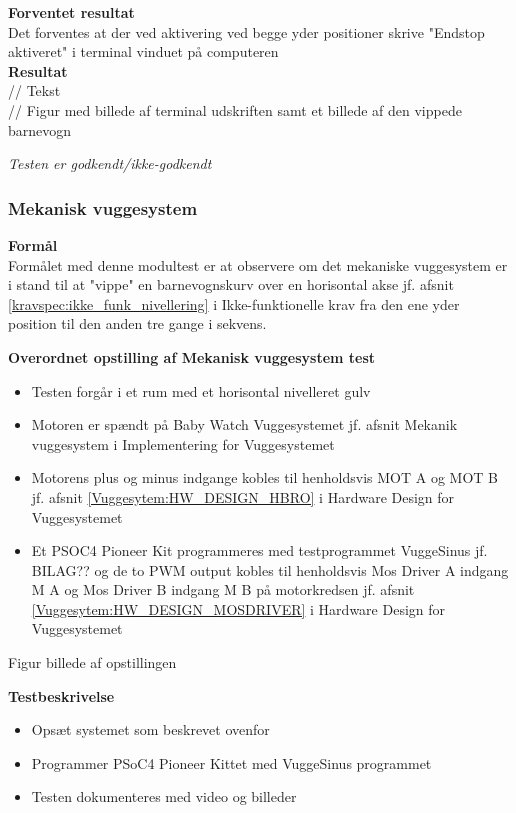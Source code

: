 \textbf{Forventet resultat} \\
Det forventes at der ved aktivering ved begge yder positioner skrive "Endstop aktiveret" i terminal vinduet på computeren \\
\textbf{Resultat} \\
// Tekst \\

// Figur med billede af terminal udskriften samt et billede af den vippede barnevogn

\textit{Testen er godkendt/ikke-godkendt}



\subsubsection{Mekanisk vuggesystem}
\textbf{Formål} \\
Formålet med denne modultest er at observere om det mekaniske vuggesystem er i stand til at "vippe" en barnevognskurv over en horisontal akse jf. afsnit \vref{kravspec:ikke_funk_nivellering} i Ikke-funktionelle krav fra den ene yder position til den anden tre gange i sekvens. 

\textbf{Overordnet opstilling af Mekanisk vuggesystem test}

\begin{itemize}
	\item Testen forgår i et rum med et horisontal nivelleret gulv
	\item Motoren er spændt på Baby Watch Vuggesystemet jf. afsnit Mekanik vuggesystem i Implementering for Vuggesystemet
	\item Motorens plus og minus indgange kobles til henholdsvis MOT A og MOT B jf. afsnit \ref{Vuggesytem:HW_DESIGN_HBRO} i Hardware Design for Vuggesystemet
	\item Et PSOC4 Pioneer Kit \citep{website:Cypress} programmeres med testprogrammet VuggeSinus jf. BILAG?? og de to PWM output kobles til henholdsvis Mos Driver A indgang M A og Mos Driver B indgang M B på motorkredsen jf. afsnit \vref{Vuggesytem:HW_DESIGN_MOSDRIVER} i Hardware Design for Vuggesystemet
\end{itemize}

Figur billede af opstillingen

\textbf{Testbeskrivelse}
\begin{itemize}
	\item Opsæt systemet som beskrevet ovenfor
	\item Programmer PSoC4 Pioneer Kittet med VuggeSinus programmet
	\item Testen dokumenteres med video og billeder
\end{itemize}


